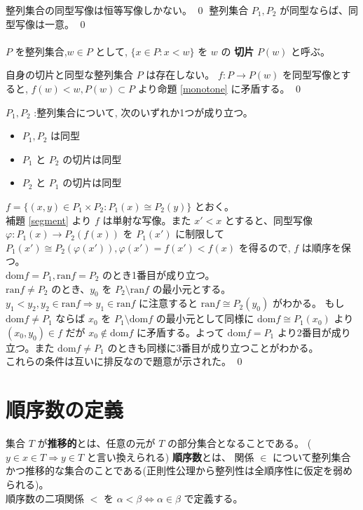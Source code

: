 \documentclass[dvipdfmx,a4paper]{jsreport}
\theoremstyle{definition}
\renewcommand{\phi}{\varphi}
\begin{document}
\cor 整列集合の同型写像は恒等写像しかない。 \qed
\cor 整列集合 $P_1,P_2$ が同型ならば、同型写像は一意。 \qed \\
\\
$P$ を整列集合,$w \in P$ として, $\{x \in P \colon x<w \}$ を $w$ の \textbf{切片} $P(w)$ と呼ぶ。

\lem\label{segment} 自身の切片と同型な整列集合 $P$ は存在しない。
\prf $f:P \to P(w)$ を同型写像とすると, $f(w)<w,P(w) \subset P$ より命題 \ref{monotone} に矛盾する。 \qed

\thm $P_1,P_2$ :整列集合について, 次のいずれか1つが成り立つ。
\begin{itemize}
    \item $P_1,P_2$ は同型
    \item $P_1$ と $P_2$ の切片は同型
    \item $P_2$ と $P_1$ の切片は同型
\end{itemize}
\prf $f=\{(x,y) \in P_1 \times P_2 \colon P_1(x) \cong P_2(y)\}$ とおく。 \\
補題 \ref{segment} より $f$ は単射な写像。また $x'<x$ とすると、同型写像 $\phi:P_1(x) \to P_2(f(x))$ を $P_1(x')$ に制限して $P_1(x') \cong P_2(\phi(x')),\phi(x')=f(x')<f(x)$ を得るので, $f$ は順序を保つ。 \\
$\mbox{dom} f=P_1,\mbox{ran} f=P_2$ のとき1番目が成り立つ。 \\
$\mbox{ran}f \neq P_2$ のとき、$y_0$ を $P_2 \setminus \mbox{ran}f$ の最小元とする。 $y_1<y_2,y_2 \in \mbox{ran}f \Rightarrow y_1 \in \mbox{ran} f$ に注意すると $\mbox{ran}f \cong P_2(y_0)$ がわかる。 もし $\mbox{dom}f \neq P_1$ ならば $x_0$ を $P_1 \setminus \mbox{dom} f$ の最小元として同様に $\mbox{dom}f \cong P_1(x_0)$ より $(x_0,y_0) \in f$ だが $x_0 \notin \mbox{dom}f$ に矛盾する。よって $\mbox{dom}f=P_1$ より2番目が成り立つ。また $\mbox{dom}f \neq P_1$ のときも同様に3番目が成り立つことがわかる。 \\
これらの条件は互いに排反なので題意が示された。 \qed 

\section{順序数の定義}
 集合 $T$ が\textbf{推移的}とは、任意の元が $T$ の部分集合となることである。 ( $y \in x \in T \Rightarrow y \in T$ と言い換えられる)
 \textbf{順序数}とは、 関係 $\in$ について整列集合かつ推移的な集合のことである(正則性公理から整列性は全順序性に仮定を弱められる)。 \\
順序数の二項関係 $<$ を $\alpha < \beta \iff \alpha \in \beta$ で定義する。
\end{document}
